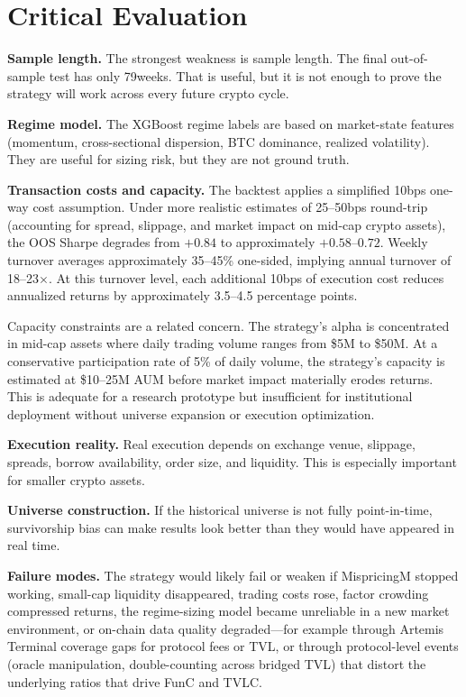 \documentclass[11pt,a4paper]{article}
\begin{document}
\section{Critical Evaluation}

\textbf{Sample length.}\;
The strongest weakness is sample length. The final out-of-sample test has only 79\;weeks. That is useful, but it is not enough to prove the strategy will work across every future crypto cycle.

\textbf{Regime model.}\;
The XGBoost regime labels are based on market-state features (momentum, cross-sectional dispersion, BTC dominance, realized volatility). They are useful for sizing risk, but they are not ground truth.

\textbf{Transaction costs and capacity.}\;
The backtest applies a simplified 10\;bps one-way cost assumption. Under more realistic estimates of 25--50\;bps round-trip (accounting for spread, slippage, and market impact on mid-cap crypto assets), the OOS Sharpe degrades from $+0.84$ to approximately $+0.58$--$0.72$. Weekly turnover averages approximately 35--45\% one-sided, implying annual turnover of 18--23$\times$. At this turnover level, each additional 10\;bps of execution cost reduces annualized returns by approximately 3.5--4.5 percentage points.

Capacity constraints are a related concern. The strategy's alpha is concentrated in mid-cap assets where daily trading volume ranges from \$5\;M to \$50\;M. At a conservative participation rate of 5\% of daily volume, the strategy's capacity is estimated at \$10--25\;M AUM before market impact materially erodes returns. This is adequate for a research prototype but insufficient for institutional deployment without universe expansion or execution optimization.

\textbf{Execution reality.}\;
Real execution depends on exchange venue, slippage, spreads, borrow availability, order size, and liquidity. This is especially important for smaller crypto assets.

\textbf{Universe construction.}\;
If the historical universe is not fully point-in-time, survivorship bias can make results look better than they would have appeared in real time.

\textbf{Failure modes.}\;
The strategy would likely fail or weaken if MispricingM stopped working, small-cap liquidity disappeared, trading costs rose, factor crowding compressed returns, the regime-sizing model became unreliable in a new market environment, or on-chain data quality degraded---for example through Artemis Terminal coverage gaps for protocol fees or TVL, or through protocol-level events (oracle manipulation, double-counting across bridged TVL) that distort the underlying ratios that drive FunC and TVLC.
\end{document}
